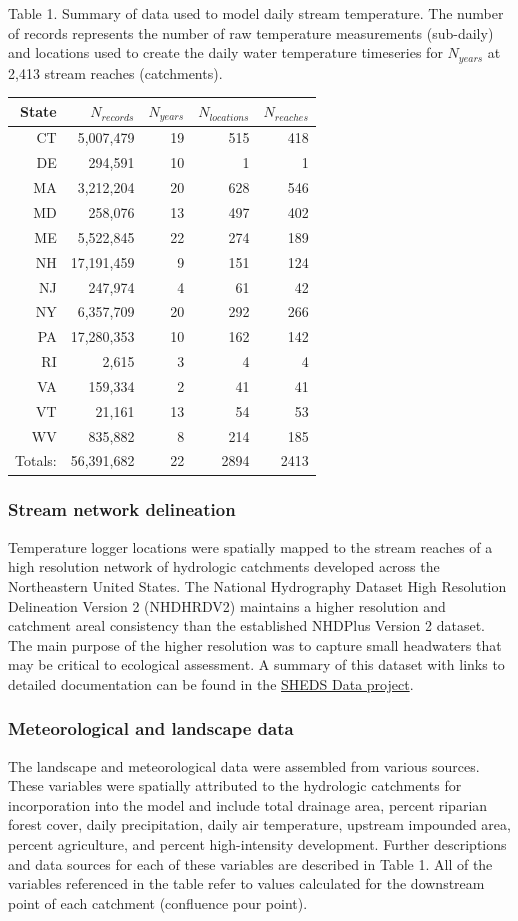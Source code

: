 Table 1. Summary of data used to model daily stream temperature. The
number of records represents the number of raw temperature measurements
(sub-daily) and locations used to create the daily water temperature
timeseries for \(N_{years}\) at 2,413 stream reaches (catchments).

\begin{longtable}[c]{@{}rrrrr@{}}
\toprule
State & \(N_{records}\) & \(N_{years}\) & \(N_{locations}\) &
\(N_{reaches}\)\tabularnewline
\midrule
\endhead
CT & 5,007,479 & 19 & 515 & 418\tabularnewline
DE & 294,591 & 10 & 1 & 1\tabularnewline
MA & 3,212,204 & 20 & 628 & 546\tabularnewline
MD & 258,076 & 13 & 497 & 402\tabularnewline
ME & 5,522,845 & 22 & 274 & 189\tabularnewline
NH & 17,191,459 & 9 & 151 & 124\tabularnewline
NJ & 247,974 & 4 & 61 & 42\tabularnewline
NY & 6,357,709 & 20 & 292 & 266\tabularnewline
PA & 17,280,353 & 10 & 162 & 142\tabularnewline
RI & 2,615 & 3 & 4 & 4\tabularnewline
VA & 159,334 & 2 & 41 & 41\tabularnewline
VT & 21,161 & 13 & 54 & 53\tabularnewline
WV & 835,882 & 8 & 214 & 185\tabularnewline
Totals: & 56,391,682 & 22 & 2894 & 2413\tabularnewline
\bottomrule
\end{longtable}

\subsubsection{Stream network
delineation}\label{stream-network-delineation}

Temperature logger locations were spatially mapped to the stream reaches
of a high resolution network of hydrologic catchments developed across
the Northeastern United States. The National Hydrography Dataset High
Resolution Delineation Version 2 (NHDHRDV2) maintains a higher
resolution and catchment areal consistency than the established NHDPlus
Version 2 dataset. The main purpose of the higher resolution was to
capture small headwaters that may be critical to ecological assessment.
A summary of this dataset with links to detailed documentation can be
found in the \href{http://conte-ecology.github.io/shedsGISData/}{SHEDS
Data project}.

\subsubsection{Meteorological and landscape
data}\label{meteorological-and-landscape-data}

The landscape and meteorological data were assembled from various
sources. These variables were spatially attributed to the hydrologic
catchments for incorporation into the model and include total drainage
area, percent riparian forest cover, daily precipitation, daily air
temperature, upstream impounded area, percent agriculture, and percent
high-intensity development. Further descriptions and data sources for
each of these variables are described in Table 1. All of the variables
referenced in the table refer to values calculated for the downstream
point of each catchment (confluence pour point).

